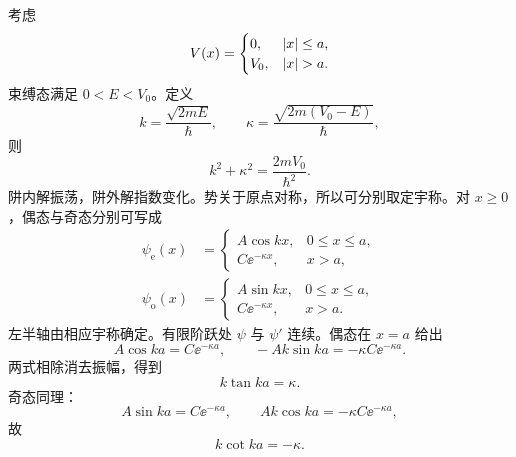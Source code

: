 

考虑
\begin{equation}
  V(x)=
  \begin{cases}
    0,&\abs x\leq a,\\
    V_0,&\abs x>a.
  \end{cases}
  \label{eq:QM-C05-S02-finite-well-potential}
\end{equation}
束缚态满足 $0<E<V_0$。定义
\begin{equation}
  k=\frac{\sqrt{2mE}}{\hbar},
  \qquad
  \kappa=\frac{\sqrt{2m(V_0-E)}}{\hbar},
  \label{eq:QM-C05-S02-finite-k-kappa}
\end{equation}
则
\begin{equation}
  k^2+\kappa^2=\frac{2mV_0}{\hbar^2}.
  \label{eq:QM-C05-S02-k-kappa-circle}
\end{equation}
阱内解振荡，阱外解指数变化。势关于原点对称，所以可分别取定宇称。对 $x\geq0$，偶态与奇态分别可写成
\begin{align}
  \psi_{\mathrm e}(x)&=
  \begin{cases}
    A\cos kx,&0\leq x\leq a,\\
    C\ee^{-\kappa x},&x>a,
  \end{cases}
  \label{eq:QM-C05-S02-even-piecewise}\\
  \psi_{\mathrm o}(x)&=
  \begin{cases}
    A\sin kx,&0\leq x\leq a,\\
    C\ee^{-\kappa x},&x>a.
  \end{cases}
  \label{eq:QM-C05-S02-odd-piecewise}
\end{align}
左半轴由相应宇称确定。有限阶跃处 $\psi$ 与 $\psi'$ 连续。偶态在 $x=a$ 给出
\begin{equation}
  A\cos ka=C\ee^{-\kappa a},
  \qquad
  -Ak\sin ka=-\kappa C\ee^{-\kappa a}.
  \label{eq:QM-C05-S02-even-matching}
\end{equation}
两式相除消去振幅，得到
\begin{equation}
  \boxed{k\tan ka=\kappa}.
  \label{eq:QM-C05-S02-even-transcendental}
\end{equation}
奇态同理：
\begin{equation}
  A\sin ka=C\ee^{-\kappa a},
  \qquad
  Ak\cos ka=-\kappa C\ee^{-\kappa a},
  \label{eq:QM-C05-S02-odd-matching}
\end{equation}
故
\begin{equation}
  \boxed{k\cot ka=-\kappa}.
  \label{eq:QM-C05-S02-odd-transcendental}
\end{equation}

